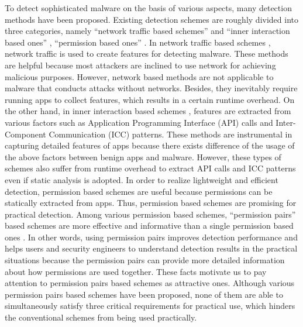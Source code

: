 \documentclass{ieeeaccess}
\begin{document}
To detect sophisticated malware on the basis of various aspects, many detection methods have been proposed.
Existing detection schemes are roughly divided into three categories, namely ``network traffic based schemes'' \cite{wang2018detecting,garg2017network} and ``inner interaction based ones'' \cite{aafer2013droidapiminer, deshotels2014droidlegacy, xu2016iccdetector, cai2018droidcat}, ``permission based ones'' \cite{sanz2013puma, li2018significant, liang2014permission, liu2014two, arora2019permpair}.
In network traffic based schemes \cite{wang2018detecting,garg2017network}, network traffic is used to create features for detecting malware.
These methods are helpful because most attackers are inclined to use network for achieving malicious purposes.  
However, network based methods are not applicable to malware that conducts attacks without networks.
Besides, they inevitably require running apps to collect features, which results in a certain runtime overhead.  
On the other hand, in inner interaction based schemes \cite{aafer2013droidapiminer, deshotels2014droidlegacy, xu2016iccdetector, cai2018droidcat}, features are extracted from various factors such as Application Programming Interface (API) calls and Inter-Component Communication (ICC) patterns.
These methods are instrumental in capturing detailed features of apps because there exists difference of the usage of the above factors between benign apps and malware. 
However, these types of schemes also suffer from runtime overhead to extract API calls and ICC patterns even if static analysis is adopted.
In order to realize lightweight and efficient detection, permission based schemes \cite{sanz2013puma, li2018significant, liang2014permission, liu2014two, arora2019permpair} are useful because permissions can be statically extracted from apps. 
Thus, permission based schemes are promising for practical detection.
Among various permission based schemes, ``permission pairs'' based schemes \cite{liang2014permission, liu2014two, arora2019permpair} are more effective and informative than a single permission based ones \cite{sanz2013puma, li2018significant}.
In other words, using permission pairs improves detection performance and helps users and security engineers to understand detection results in the practical situations because the permission pairs can provide more detailed information about how permissions are used together.
These facts motivate us to pay attention to permission pairs based schemes \cite{liang2014permission, liu2014two, arora2019permpair} as attractive ones.  
Although various permission pairs based schemes \cite{liang2014permission, liu2014two, arora2019permpair} have been proposed, none of them are able to simultaneously satisfy three critical requirements for practical use, which hinders the conventional schemes from being used practically.
\end{document}
